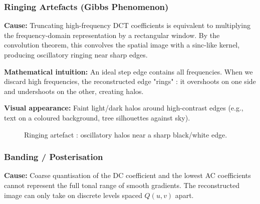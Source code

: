 \subsubsection{Ringing Artefacts (Gibbs Phenomenon)}

\textbf{Cause:} Truncating high-frequency DCT coefficients is equivalent to multiplying the frequency-domain representation by a rectangular window. By the convolution theorem, this convolves the spatial image with a sinc-like kernel, producing oscillatory ringing near sharp edges.

\textbf{Mathematical intuition:} An ideal step edge contains all frequencies. When we discard high frequencies, the reconstructed edge "rings" : it overshoots on one side and undershoots on the other, creating halos.

\textbf{Visual appearance:} Faint light/dark halos around high-contrast edges (e.g., text on a coloured background, tree silhouettes against sky).

\begin{figure}[H]
\centering
{}
\caption{Ringing artefact : oscillatory halos near a sharp black/white edge.}
\label{fig:ringing}
\end{figure}

\subsubsection{Banding / Posterisation}

\textbf{Cause:} Coarse quantisation of the DC coefficient and the lowest AC coefficients cannot represent the full tonal range of smooth gradients. The reconstructed image can only take on discrete levels spaced $Q(u,v)$ apart.

